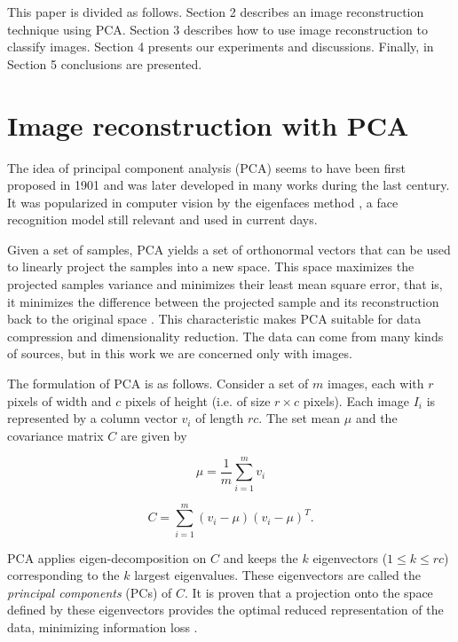 \documentclass[10pt, conference, compsocconf]{IEEEtran}
\begin{document}
This paper is divided as follows. Section 2 describes an image reconstruction technique using PCA. Section 3 describes how to use image reconstruction to classify images. Section 4 presents our experiments and discussions. Finally, in Section 5 conclusions are presented.


\section{Image reconstruction with PCA}

The idea of principal component analysis (PCA) seems to have been first proposed in 1901 \cite{sirovich87} and was later developed in many works during the last century. It was popularized in computer vision by the eigenfaces method \cite{turk91}, a face recognition model still relevant and used in current days.

Given a set of samples, PCA yields a set of orthonormal vectors that can be used to linearly project the samples into a new space. This space maximizes the projected samples variance and minimizes their least mean square error, that is, it minimizes the difference between the projected sample and its reconstruction back to the original space \cite{shlens09}. This characteristic makes PCA suitable for data compression and dimensionality reduction. The data can come from many kinds of sources, but in this work we are concerned only with images.

The formulation of PCA is as follows. Consider a set of $m$ images, each with $r$ pixels of width and $c$ pixels of height (i.e. of size $r \times c$ pixels). Each image $I_i$ is represented by a column vector $v_i$ of length $rc$. The set mean $\mu$ and the covariance matrix $C$ are given by

\begin{equation}
  \mu = \frac{1}{m} \sum_{i=1}^m{v_i}
\end{equation}

\begin{equation}
  C = \sum_{i=1}^m{(v_i - \mu)(v_i - \mu)^T}.
\end{equation}

PCA applies eigen-decomposition on $C$ and keeps the $k$ eigenvectors ($1 \leq k \leq rc$) corresponding to the $k$ largest eigenvalues. These eigenvectors are called the \emph{principal components} (PCs) of $C$. It is proven that a projection onto the space defined by these eigenvectors provides the optimal reduced representation of the data, minimizing information loss \cite{shlens09}.
\end{document}
